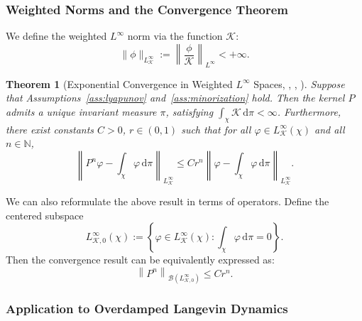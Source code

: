 \documentclass[11pt, twoside]{report}
\newtheorem{theorem}{Theorem}[section]
\begin{document}
\subsubsection{Weighted Norms and the Convergence Theorem}

We define the weighted $L^\infty$ norm via the function $\mathcal{K}$:
\[
\|\phi\|_{L^\infty_\mathcal{K}} := \left\| \frac{\phi}{\mathcal{K}} \right\|_{L^\infty} < +\infty.
\]

\begin{theorem}[Exponential Convergence in Weighted $L^\infty$ Spaces,  \texorpdfstring{\cite[Theorem~15.0.1]{Meyn2012-oq}}{}, \texorpdfstring{\cite[Theorem~1.2]{Hairer2011-of}}{}, \texorpdfstring{\cite[Theorem 2.25]{Lelievre2016-hx}}]
\label{thm:exp-conv-linf}
Suppose that Assumptions~\ref{ass:lyapunov} and~\ref{ass:minorization} hold. Then the kernel $P$ admits a unique invariant measure $\pi$, satisfying $\int_\chi \mathcal{K} \, \mathrm{d}\pi < \infty$. Furthermore, there exist constants $C > 0$, $r \in (0,1)$ such that for all $\varphi \in L^\infty_\mathcal{K}(\chi)$ and all $n \in \mathbb{N}$,
\[
\left\|P^n \varphi - \int_\chi \varphi \, \mathrm{d}\pi \right\|_{L^\infty_\mathcal{K}} \leq C r^n \left\|\varphi - \int_\chi \varphi \, \mathrm{d}\pi \right\|_{L^\infty_\mathcal{K}}.
\]
\end{theorem}
We can also reformulate the above result in terms of operators. Define the centered subspace
\[
L^\infty_{\mathcal{K},0}(\chi) := \left\{ \varphi \in L^\infty_{\mathcal{K}}(\chi) : \int_\chi \varphi \, \mathrm{d}\pi = 0 \right\}.
\]
Then the convergence result can be equivalently expressed as:
\[
\left\| P^n \right\|_{\mathcal{B}(L^\infty_{\mathcal{K},0})} \leq C r^n.
\]

\subsubsection{Application to Overdamped Langevin Dynamics}
\end{document}
